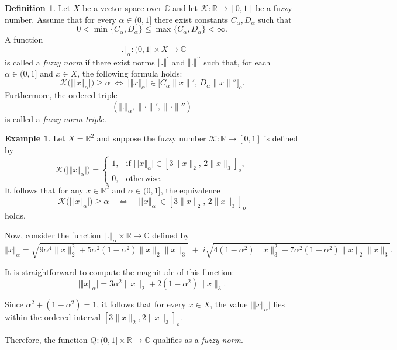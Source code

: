 \documentclass[preprint,12pt]{elsarticle}
\newcommand{\norm}[1]{\left\Vert#1\right\Vert}
\theoremstyle{definition}
\newtheorem{definition}{Definition}[section]
\newtheorem{example}[theorem]{Example}
\begin{document}
\begin{definition}\label{def:Definition of fuzzy norm}
	Let $X$ be a vector space over $\mathbb{C}$ and let $\mathcal{K}:\mathbb{R} \to [0,1]$ be a fuzzy number.  
	Assume that for every  $\alpha\in(0,1]$ there exist constants $C_\alpha, D_\alpha$ such that
	\[
	0 < \min\{C_\alpha, D_\alpha\} \le \max\{C_\alpha, D_\alpha\} < \infty.
	\] 
	A function 
	\[
	\norm{.}_\alpha : (0,1] \times X \to \mathbb{C}
	\]
	is called a \emph{fuzzy norm} if there exist norms 
	$\norm{.}^\prime$ 
	and $\norm{.}^{\prime\prime}$  
	such that, for each $\alpha \in (0,1]$ and $x \in X$, the following formula holds:
	\begin{equation}\label{eq:fuzzy_norm}
		\mathcal{K}\bigl(\big\vert\norm{x}_\alpha \big\vert\bigr) \geq \alpha
		\;\Leftrightarrow\;
		\big| \norm{x}_\alpha\big| \in 
		\big[ C_\alpha\|x\|',\, D_\alpha\|x\|'' \big]_o.
	\end{equation}
	Furthermore, the ordered triple 
	\[
	(\norm{.}_\alpha, \| \cdot \|', \| \cdot \|'')
	\]
	is called a \emph{fuzzy norm triple}.
	
\end{definition}

\begin{example}
	Let $X = \mathbb{R}^2$ and suppose the fuzzy number 
	$\mathcal{K} : \mathbb{R} \to [0,1]$ is defined by
	\[
	\mathcal{K}\big(\big\vert\norm{x}_\alpha \big\vert\big) = 
	\begin{cases}
		1, & \text{if } \big\vert\norm{x}_\alpha \big\vert \in [3 \|x\|_2,\, 2 \|x\|_3]_o, \\[6pt]
		0, & \text{otherwise}.
	\end{cases}
	\]
	It follows that for any $x \in \mathbb{R}^2$ and $\alpha \in (0,1]$, the equivalence
	\[
	\mathcal{K}\big(\big\vert\norm{x}_\alpha \big\vert\big) \geq \alpha \quad \Leftrightarrow \quad \big\vert\norm{x}_\alpha \big\vert \in [3 \|x\|_2,\, 2 \|x\|_3]_o
	\]
	holds.  
	
	Now, consider the function $\norm{.}_\alpha \times \mathbb{R} \to \mathbb{C}$ defined by
	\[
	\norm{x}_\alpha  = \sqrt{9 \alpha^4 \|x\|_2^2 + 5 \alpha^2 (1 - \alpha^2) \|x\|_2 \|x\|_3} \; + \; i \sqrt{4 (1 - \alpha^2) \|x\|_3^2 + 7 \alpha^2 (1 - \alpha^2) \|x\|_2 \|x\|_3}.
	\]
	
	It is straightforward to compute the magnitude of this function:
	\[
	\big\vert\norm{x}_\alpha \big\vert = 3 \alpha^2 \|x\|_2 + 2 (1 - \alpha^2) \|x\|_3.
	\]
	
	Since $\alpha^2 + (1 - \alpha^2) = 1$, it follows that for every $x \in X$, the value $\big\vert\norm{x}_\alpha \big\vert$ lies within the ordered interval $[3 \|x\|_2, 2 \|x\|_3]_o$.  
	
	Therefore, the function $Q : (0,1] \times \mathbb{R} \to \mathbb{C}$ qualifies as a \emph{fuzzy norm}.
\end{example}
\end{document}
